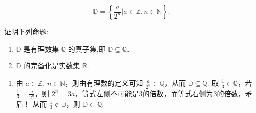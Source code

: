 \begin{enumerate}
    \[\mathbb{D} = \left\{\frac{a}{2^{n}} |a\in \mathbb{Z},n\in \mathbb{N}\right\}.\]

    证明下列命题:
    \begin{enumerate}
        \item[(a)]$\mathbb{D}$ 是有理数集 $\mathbb{Q}$ 的真子集,即 $\mathbb{D}\subseteq \mathbb{Q}$.
        \item[(b)]$\mathbb{D}$ 的完备化是实数集 $\mathbb{R}$.
    \end{enumerate}
    \begin{solution}
        \begin{enumerate}
        \item[(a)] 由 $a\in\mathbb{Z},\,n\in\mathbb{N}$，则由有理数的定义可知 $\displaystyle\frac{a}{2^n}\in\mathbb{Q}$，从而 $\mathbb{D}\subseteq\mathbb{Q}$.
        取 $\displaystyle\frac{1}{3}\in\mathbb{Q}$，若 $\displaystyle\frac{1}{3}=\frac{a}{2^n}$，则 $2^n=3a$，等式左侧不可能是3的倍数，而等式右侧为3的倍数，矛盾！
        从而 $\displaystyle\frac{1}{3}\notin \mathbb{D}$，则 $\mathbb{D}\subset\mathbb{Q}$. 
        

\end{enumerate}
\end{solution}
\end{enumerate}
